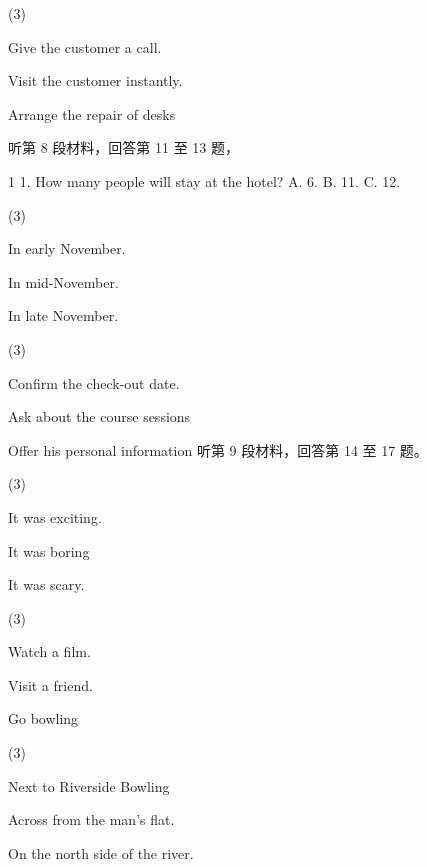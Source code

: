 \documentclass{英语试卷}
\begin{document}
\begin{choices}(3)
  \item Give the customer a call.
  \item Visit the customer instantly.
  \item Arrange the repair of desks
\end{choices}
\par 听第 8 段材料，回答第 11 至 13 题，\par
\par 1 1. How many people will stay at the hotel? A. 6. B. 11. C. 12.\par
{}
\begin{choices}(3)
  \item In early November.
  \item In mid-November.
  \item In late November.
\end{choices}
\begin{choices}(3)
  \item Confirm the check-out date.
  \item Ask about the course sessions
  \item Offer his personal information 听第 9 段材料，回答第 14 至 17 题。
\end{choices}
\begin{choices}(3)
  \item It was exciting.
  \item It was boring
  \item It was scary.
\end{choices}
\begin{choices}(3)
  \item Watch a film.
  \item Visit a friend.
  \item Go bowling
\end{choices}
\begin{choices}(3)
  \item Next to Riverside Bowling
  \item Across from the man's flat.
  \item On the north side of the river.
\end{choices}
\end{document}
